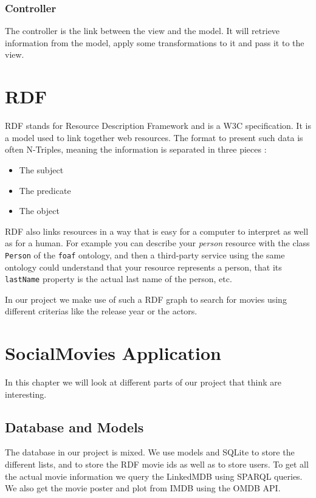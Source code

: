 \documentclass[12pt,a4paper]{article}
\begin{document}
\subsubsection{Controller}
The controller is the link between the view and the model. It will retrieve information from the model, apply some transformations to it and pass it to the view.

\section{RDF}
RDF stands for Resource Description Framework and is a W3C specification. It is a model used to link together web resources. The format to present such data is often N-Triples, meaning the information is separated in three pieces :
\begin{itemize}
\item The subject
\item The predicate
\item The object
\end{itemize}

RDF also links resources in a way that is easy for a computer to interpret as well as for a human. For example you can describe your \textit{person} resource with the class \texttt{Person} of the \texttt{foaf} ontology, and then a third-party service using the same ontology could understand that your resource represents a person, that its \texttt{lastName} property is the actual last name of the person, etc.

In our project we make use of such a RDF graph to search for movies using different criterias like the release year or the actors.

\section{SocialMovies Application}

In this chapter we will look at different parts of our project that think are interesting.

\subsection{Database and Models}
The database in our project is mixed. We use models and SQLite to store the different lists, and to store the RDF movie ids as well as to store users. To get all the actual movie information we query the LinkedMDB using SPARQL queries. We also get the movie poster and plot from IMDB using the OMDB API.
\end{document}

